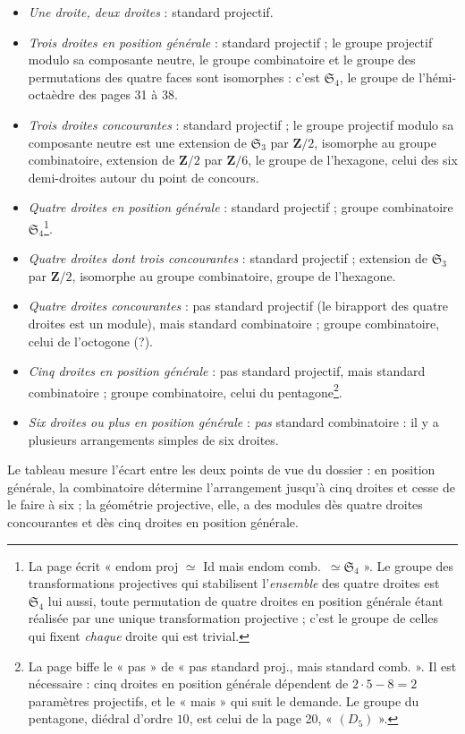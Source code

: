 \documentclass[11pt,a4paper]{article}
\begin{document}
\begin{itemize}
  \item \emph{Une droite, deux droites} : standard projectif.
  \item \emph{Trois droites en position générale} : standard projectif ; le groupe
  projectif modulo sa composante neutre, le groupe combinatoire et le groupe
  des permutations des quatre faces sont isomorphes : c'est
  $\mathfrak{S}_4$, le groupe de l'hémi-octaèdre des pages 31 à 38.
  \item \emph{Trois droites concourantes} : standard projectif ; le groupe projectif
  modulo sa composante neutre est une extension de $\mathfrak{S}_3$ par
  $\mathbf{Z}/2$, isomorphe au groupe combinatoire, extension de $\mathbf{Z}/2$ par
  $\mathbf{Z}/6$, le groupe de l'hexagone, celui des six demi-droites autour
  du point de concours.
  \item \emph{Quatre droites en position générale} : standard projectif ; groupe
  combinatoire $\mathfrak{S}_4$\footnote{La page écrit « endom proj $\simeq$
  Id mais endom comb.\ $\simeq \mathfrak{S}_4$ ». Le groupe des transformations
  projectives qui stabilisent l'\emph{ensemble} des quatre droites est
  $\mathfrak{S}_4$ lui aussi, toute permutation de quatre droites en position
  générale étant réalisée par une unique transformation projective ; c'est
  le groupe de celles qui fixent \emph{chaque} droite qui est trivial.}.
  \item \emph{Quatre droites dont trois concourantes} : standard projectif ;
  extension de $\mathfrak{S}_3$ par $\mathbf{Z}/2$, isomorphe au groupe
  combinatoire, groupe de l'hexagone.
  \item \emph{Quatre droites concourantes} : pas standard projectif (le birapport
  des quatre droites est un module), mais standard combinatoire ; groupe
  combinatoire, celui de l'octogone (?).
  \item \emph{Cinq droites en position générale} : pas standard projectif, mais
  standard combinatoire ; groupe combinatoire, celui du
  pentagone\footnote{La page biffe le « pas » de « pas standard proj., mais
  standard comb. ». Il est nécessaire : cinq droites en position générale
  dépendent de $2 \cdot 5 - 8 = 2$ paramètres projectifs, et le « mais » qui
  suit le demande. Le groupe du pentagone, diédral d'ordre $10$, est celui de
  la page 20, « $(D_5)$ ».}.
  \item \emph{Six droites ou plus en position générale} : \emph{pas} standard
  combinatoire : il y a plusieurs arrangements simples de six droites.
\end{itemize}
Le tableau mesure l'écart entre les deux points de vue du dossier : en
position générale, la combinatoire détermine l'arrangement jusqu'à cinq
droites et cesse de le faire à six ; la géométrie projective, elle, a des
modules dès quatre droites concourantes et dès cinq droites en position
générale.
\end{document}
